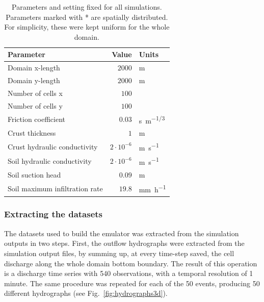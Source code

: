 \begin{table}[h]
  \centering
  \caption{Parameters and setting fixed for all simulations. Parameters marked with * are spatially distributed. For simplicity, these were kept uniform for the whole domain.}
  \label{tab:simulations_parameters}
  \begin{threeparttable}
    \begin{tabular}{lrl}
      \toprule
      \textbf{Parameter} & \textbf{Value} & \textbf{Units} \\
      \midrule
      Domain x-length                          &    $\num{2000}$           & \si{\meter}   \\
      Domain y-length                          &    $\num{2000}$           & \si{\meter}   \\
      Number of cells x                        &    $100$             &    \\
      Number of cells y                        &    $100$             &    \\
      Friction coefficient\tnote{*}            &    $0.03$            & \si{s.m^{-1/3}}\\
      Crust thickness\tnote{*}                 &    $1$               & \si{\meter}\\
      Crust hydraulic conductivity\tnote{*}    &    $2\cdot 10^{-6}$  & \si{\meter\per\second}\\
      Soil hydraulic conductivity\tnote{*}     &    $2\cdot 10^{-6}$  & \si{\meter\per\second}\\
      Soil suction head\tnote{*}               &    $0.09$      & \si{\meter}\\
      Soil maximum infiltration rate\tnote{*}  &    $19.8$      & \si{\milli\meter\per\hour}\\
      \bottomrule
    \end{tabular}
  \end{threeparttable}
\end{table}

\subsubsection{Extracting the datasets}
The datasets used to build the emulator was extracted from the simulation outputs in two steps.
First, the outflow hydrographs were extracted from the simulation output files, by summing up, at every time-step saved, the cell discharge along the whole domain bottom boundary. The result of this operation is a discharge time series with \num{540} observations, with a temporal resolution of 1 minute.
The same procedure was repeated for each of the 50 events, producing \num{50} different hydrographs (see Fig.~\ref{fig:hydrographs3d}).\\

